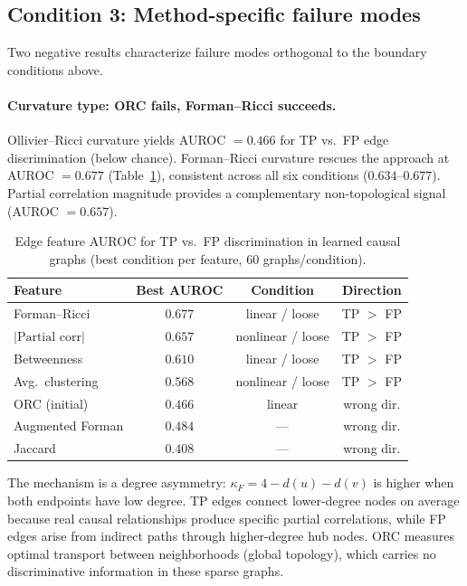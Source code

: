 \documentclass[11pt]{article}
\begin{document}
\subsection{Condition 3: Method-specific failure modes}
\label{sec:res-failures}

Two negative results characterize failure modes orthogonal to the boundary conditions above.

\paragraph{Curvature type: ORC fails, Forman--Ricci succeeds.}
Ollivier--Ricci curvature yields AUROC $= 0.466$ for TP vs.\ FP edge discrimination (below chance).
Forman--Ricci curvature rescues the approach at AUROC $= 0.677$ (Table~\ref{tab:curvature}), consistent across all six conditions ($0.634$--$0.677$).
Partial correlation magnitude provides a complementary non-topological signal (AUROC $= 0.657$).

\begin{table}[t]
\centering
\caption{Edge feature AUROC for TP vs.\ FP discrimination in learned causal graphs (best condition per feature, 60 graphs/condition).}
\label{tab:curvature}
\small
\begin{tabular}{@{}lccc@{}}
\toprule
\textbf{Feature} & \textbf{Best AUROC} & \textbf{Condition} & \textbf{Direction} \\
\midrule
Forman--Ricci & $\mathbf{0.677}$ & linear / loose & TP $>$ FP \\
$|\text{Partial corr}|$ & $0.657$ & nonlinear / loose & TP $>$ FP \\
Betweenness & $0.610$ & linear / loose & TP $>$ FP \\
Avg.\ clustering & $0.568$ & nonlinear / loose & TP $>$ FP \\
\midrule
ORC (initial) & $0.466$ & linear & wrong dir. \\
Augmented Forman & $0.484$ & --- & wrong dir. \\
Jaccard & $0.408$ & --- & wrong dir. \\
\bottomrule
\end{tabular}
\end{table}

The mechanism is a degree asymmetry: $\kappa_F = 4 - d(u) - d(v)$ is higher when both endpoints have low degree.
TP edges connect lower-degree nodes on average because real causal relationships produce specific partial correlations, while FP edges arise from indirect paths through higher-degree hub nodes.
ORC measures optimal transport between neighborhoods (global topology), which carries no discriminative information in these sparse graphs.
\end{document}

